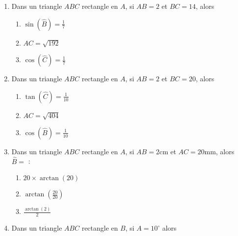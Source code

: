 \documentclass[oneside,twoside]{book}
\begin{document}
\begin{enumerate}
\begin{enumerate}
\end{enumerate}



\item Dans un triangle $ABC$ rectangle en $A$, si $AB=2$ et $BC=14$, alors

\begin{enumerate}

\item\MauvaiseReponse $\sin (\hat{B})=\frac{1}{7}$

\item\BonneReponse $AC=\sqrt{192}$

\item\MauvaiseReponse $\cos (\hat{C})=\frac{1}{7}$

\end{enumerate}



\item Dans un triangle $ABC$ rectangle en $A$, si $AB=2$ et $BC=20$, alors

\begin{enumerate}

\item\MauvaiseReponse $\tan (\hat{C})=\frac{1}{10}$

\item\MauvaiseReponse $AC=\sqrt{404}$

\item\BonneReponse $\cos (\hat{B})=\frac{1}{10}$

\end{enumerate}



\item Dans un triangle $ABC$ rectangle en $A$, si $AB=2\mathrm{cm}$ et $AC=20\mathrm{mm}$, alors $\hat{B}=$ :

\begin{enumerate}

\item\MauvaiseReponse $20\times\arctan\left(20\right)$

\item\BonneReponse $\arctan\left(\frac{20}{20}\right)$

\item\MauvaiseReponse $\frac{\arctan\left(2\right)}{2}$

\end{enumerate}


\item Dans un triangle $ABC$ rectangle en $B$, si $\widehat{A}=10^{\circ}$ alors


\end{enumerate}
\end{document}
